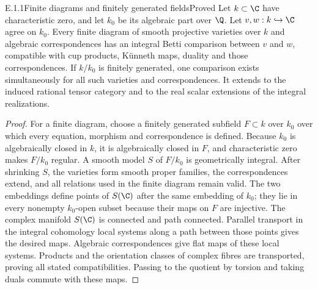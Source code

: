 \begin{result}{E.1.1}{Finite diagrams and finitely generated fields}{Proved}
Let $k\subset\C$ have characteristic zero, and let $k_0$ be its algebraic part over $\Q$. Let $v,w:k\hookrightarrow\C$ agree on $k_0$. Every finite diagram of smooth projective varieties over $k$ and algebraic correspondences has an integral Betti comparison between $v$ and $w$, compatible with cup products, K\"unneth maps, duality and those correspondences. If $k/k_0$ is finitely generated, one comparison exists simultaneously for all such varieties and correspondences. It extends to the induced rational tensor category and to the real scalar extensions of the integral realizations.
\end{result}
\begin{proof}
For a finite diagram, choose a finitely generated subfield $F\subset k$ over $k_0$ over which every equation, morphism and correspondence is defined. Because $k_0$ is algebraically closed in $k$, it is algebraically closed in $F$, and characteristic zero makes $F/k_0$ regular. A smooth model $S$ of $F/k_0$ is geometrically integral. After shrinking $S$, the varieties form smooth proper families, the correspondences extend, and all relations used in the finite diagram remain valid. The two embeddings define points of $S(\C)$ after the same embedding of $k_0$; they lie in every nonempty $k_0$-open subset because their maps on $F$ are injective. The complex manifold $S(\C)$ is connected and path connected. Parallel transport in the integral cohomology local systems along a path between those points gives the desired maps. Algebraic correspondences give flat maps of these local systems. Products and the orientation classes of complex fibres are transported, proving all stated compatibilities. Passing to the quotient by torsion and taking duals commute with these maps.


\end{proof}
